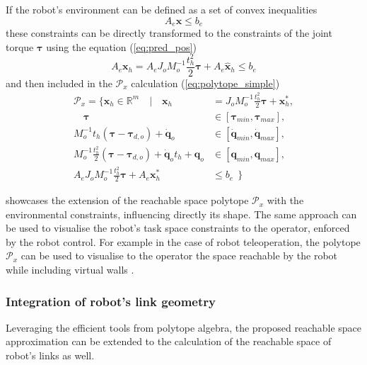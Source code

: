 If the robot's environment can be defined as a set of convex inequalities
\begin{equation}
    A_e \bm{x} \leq b_e
\end{equation}
these constraints can be directly transformed to the constraints of the joint torque $\bm{\tau}$ using the equation (\ref{eq:pred_pos})
\begin{equation}
    A_e\bm{x}_{h} = A_e J_o M_o^{-1}\frac{t_h^2}{2} \bm{\tau}  + A_e \hat{\bm{x}}_{h} \leq b_e
    \label{eq:env_limits}
\end{equation}
and then included in the $\mathcal{P}_x$ calculation (\ref{eq:polytope_simple})
\begin{equation}
\begin{split}
    \mathcal{P}_x= \{ \bm{x}_h \in \mathbb{R}^m \quad| \quad \bm{x}_h &= J_o M_o^{-1}\frac{t_h^2}{2}\bm{\tau} + \bm{x}^*_h,\\
   \quad \bm{\tau} &\in \left[\bm{\tau}_{min},\bm{\tau}_{max}\right],\\
    M_o^{-1}t_h (\bm{\tau} -\bm{\tau}_{d,o})+ \dot{\bm{q}}_o &\in \left[\dot{\bm{q}}_{min},\dot{\bm{q}}_{max}\right],\\
   M_o^{-1}\frac{t_h^2}{2}(\bm{\tau} -\bm{\tau}_{d,o}) +  \dot{\bm{q}}_ot_h + \bm{q}_o &\in \left[\bm{q}_{min},\bm{q}_{max}\right],\\
   A_e J_o M_o^{-1}\frac{t_h^2}{2} \bm{\tau}  + A_e \bm{x}^*_h &\leq b_e ~~\}
\end{split} 
\label{eq:env}
\end{equation}

 showcases the extension of the reachable space polytope $\mathcal{P}_x$ with the environmental constraints, influencing directly its shape. The same approach can be used to visualise the robot's task space constraints to the operator, enforced by the robot control. For example in the case of robot teleoperation, the polytope $\mathcal{P}_x$ can be used to visualise to the operator the space reachable by the robot while including virtual walls \cite{Colgate1996Cobots}.




\subsubsection{Integration of robot's link geometry}

Leveraging the efficient tools from polytope algebra, the proposed reachable space approximation can be extended to the calculation of the reachable space of robot's links as well.

